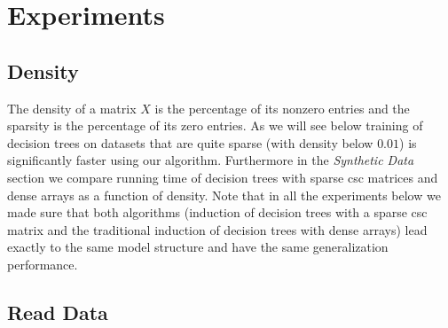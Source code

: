 \section{Experiments} \label{sec:experiments}

\subsection{Density}
The density of a matrix $X$ is the percentage of its nonzero entries and the sparsity is the percentage of its zero entries. As we will see below training of decision trees on datasets that are quite sparse (with density below $0.01$) is significantly faster using our algorithm. Furthermore in the \emph{Synthetic Data} section we compare running time of decision trees with sparse csc matrices and dense arrays as a function of density. Note that in all the experiments below we made sure that both algorithms (induction of decision trees with a sparse csc matrix and the traditional induction of decision trees with dense arrays) lead exactly to the same model structure and have the same generalization performance.

\subsection{Read Data}

